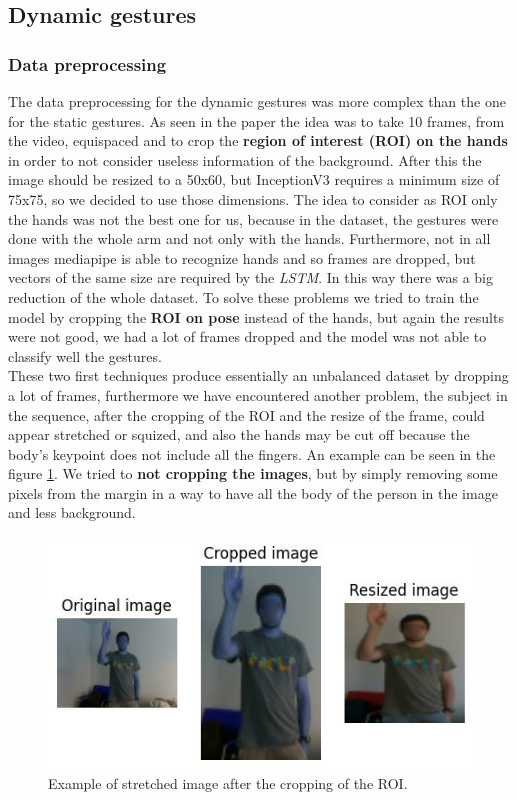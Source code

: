 \documentclass[10pt,twocolumn,letterpaper]{article}
\begin{document}
\subsection{Dynamic gestures}
\subsubsection{Data preprocessing}
\label{subsec:datapreprocessing}
The data preprocessing for the dynamic gestures was more complex than the one for the static gestures. As seen in the paper \cite{electronics13163233} the idea was to take 10 frames, from the video, equispaced and to crop the \textbf{region of interest (ROI) on the hands} in order to not consider useless information of the background.
After this the image should be resized to a 50x60, but InceptionV3 requires a minimum size 
of 75x75, so we decided to use those dimensions.
The idea to consider as ROI only the hands was not the best one for us, because in the dataset, the gestures were done with the whole 
arm and not only with the hands. Furthermore, not in all images mediapipe is able to recognize hands and so frames are dropped, 
but vectors of the same size are required by the \textit{LSTM}. In this way there was a big reduction of the whole dataset.
To solve these problems we tried to train the model by cropping the \textbf{ROI on pose} instead of the hands, but again the results were not good, we had a lot of frames dropped and the model was not able to classify well the gestures. \\ 
These two first techniques produce essentially an unbalanced dataset by dropping a lot of frames, 
furthermore we have encountered another problem, the subject in the sequence, 
after the cropping of the ROI and the resize of the frame, could appear stretched or squized, and 
also the hands may be cut off because the body's keypoint does not include all the fingers.
An example can be seen in the figure \ref{fig:stretchedImage}.
We tried to \textbf{not cropping the images}, but by simply removing some pixels from the margin in a way to have all the body of the person in the image and less background.
\begin{figure}[h]
   \centering
   \includegraphics[width=1\linewidth]{images/stretched.jpg}
   \caption{Example of stretched image after the cropping of the ROI.}
   \label{fig:stretchedImage}
\end{figure}
\end{document}
